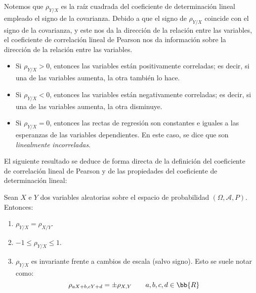 Notemos que $\rho_{Y/X}$ es la raíz cuadrada del coeficiente de determinación lineal empleado el signo de la covarianza. Debido a que el signo de $\rho_{Y/X}$ coincide con el signo de la covarianza, y este nos da la dirección de la relación entre las variables, el coeficiente de correlación lineal de Pearson nos da información sobre la dirección de la relación entre las variables.
\begin{itemize}
    \item Si $\rho_{Y/X}>0$, entonces las variables están positivamente correladas; es decir, si una de las variables aumenta, la otra también lo hace.
    \item Si $\rho_{Y/X}<0$, entonces las variables están negativamente correladas; es decir, si una de las variables aumenta, la otra disminuye.
    \item Si $\rho_{Y/X}=0$, entonces las rectas de regresión son constantes e iguales a las esperanzas de las variables dependientes. En este caso, se dice que son \emph{linealmente incorreladas}.
\end{itemize}

El siguiente resultado se deduce de forma directa de la definición del coeficiente de correlación lineal de Pearson y de las propiedades del coeficiente de determinación lineal:
\begin{prop}
    Sean $X$ e $Y$ dos variables aleatorias sobre el espacio de probabilidad $(\Omega, \mathcal{A}, P)$. Entonces:
    \begin{enumerate}
        \item $\rho_{Y/X} = \rho_{X/Y}$.
        \item $-1\leq \rho_{Y/X} \leq 1$.
        \item $\rho_{Y/X}$ es invariante frente a cambios de escala (salvo signo). Esto se suele notar como:
        \begin{equation*}
            \rho_{aX+b,cY+d} = \pm \rho_{X,Y}\qquad a,b,c,d\in\bb{R}
        \end{equation*}
    \end{enumerate}
\end{prop}